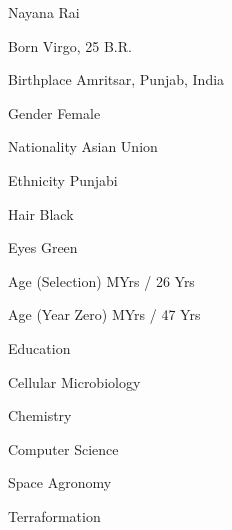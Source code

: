 

{
    \SetupCharacterTable

    \bTABLEbody

        \bTR 
            \bTD[nc=2] \midaligned{\rotate[rotation=42]{\color[red]{\bft Todo: Character's image goes here.}}} \eTD 
        \eTR

        \bTR 
            \bTD[nc=2] Nayana Rai \eTD 
        \eTR

        \bTR
            \bTC Born \eTC
             Virgo, 25 B.R. \eTC
        \eTR

        \bTR
            \bTC Birthplace \eTC
            \bTC Amritsar, Punjab, India \eTC
        \eTR
        
        \bTR
            \bTC Gender \eTC
            \bTC Female \eTC
        \eTR
            
        \bTR
            \bTC Nationality \eTC
            \bTC Asian Union \eTC
        \eTR
        
        \bTR
            \bTC Ethnicity \eTC
            \bTC Punjabi \eTC
        \eTR
        
        \bTR
          \bTC Hair \eTC
          \bTC Black \eTC
        \eTR
        
        \bTR
            \bTC Eyes \eTC
            \bTC Green \eTC
        \eTR

        \bTR
            \bTC Age (Selection) \eTC %
             MYrs / 26 Yrs \eTC %
        \eTR

        \bTR
            \bTC Age (Year Zero) \eTC
             MYrs / 47 Yrs \eTC
        \eTR

        \bTR
            \bTC Education \eTC
            \bTC 
                \startitemize[4]
                \startpacked
                \item Cellular Microbiology
                \item Chemistry
                \item Computer Science
                \item Space Agronomy
                \item Terraformation
                \stoppacked
                \stopitemize
            \eTC
        \eTR
        
}
